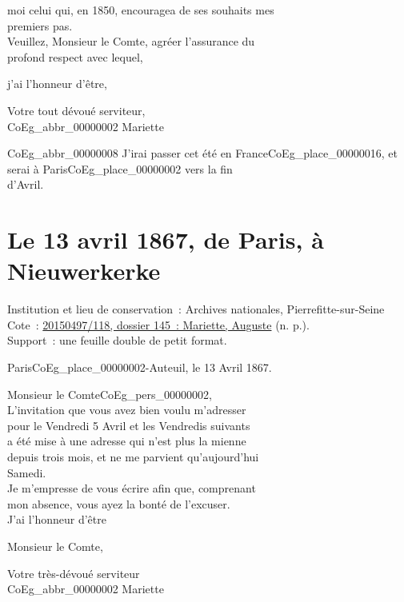 \documentclass{book}
\begin{document}
moi celui qui, en 1850, encouragea de ses souhaits mes\\
premiers pas.\\
\indent Veuillez, Monsieur le Comte, agréer l’assurance du\\
profond respect avec lequel,\\
\begin{center} j’ai l’honneur d’être,\end{center}
\begin{center}\hspace{5cm} Votre tout dévoué serviteur,\\
\hspace{5cm} \gls{CoEg_abbr_00000002} Mariette\end{center}
\gls{CoEg_abbr_00000008} J’irai passer cet été en France\gls{CoEg_place_00000016}, et serai à Paris\gls{CoEg_place_00000002} vers la fin\\
d’Avril.

\hypertarget{CoEg_Mariette_1867-04-13}{}
\section*{Le 13 avril 1867, de Paris, à Nieuwerkerke}  
{\footnotesize
\noindent Institution et lieu de conservation~: Archives nationales, Pierrefitte-sur-Seine\\
Cote~: \hyperlink{CoEg_Mariette_ms_001}{20150497/118, dossier 145~: Mariette, Auguste} (n. p.).\\
Support~: une feuille double de petit format.}

\begin{flushright}Paris\gls{CoEg_place_00000002}-Auteuil, le 13 Avril 1867.\end{flushright}

\hspace{1cm} Monsieur le Comte\gls{CoEg_pers_00000002},\\

\indent L’invitation que vous avez bien voulu m’adresser\\
pour le Vendredi 5 Avril et les Vendredis suivants\\
a été mise à une adresse qui n’est plus la mienne\\
depuis trois mois, et ne me parvient qu’aujourd’hui\\
Samedi.\\
\indent Je m’empresse de vous écrire afin que, comprenant\\
mon absence, vous ayez la bonté de l’excuser.\\
\indent J’ai l’honneur d’être\\
\begin{center} Monsieur le Comte,\end{center}
\begin{center}\hspace{5cm} Votre très-dévoué serviteur\\
\hspace{5cm} \gls{CoEg_abbr_00000002} Mariette\end{center}
\end{document}
